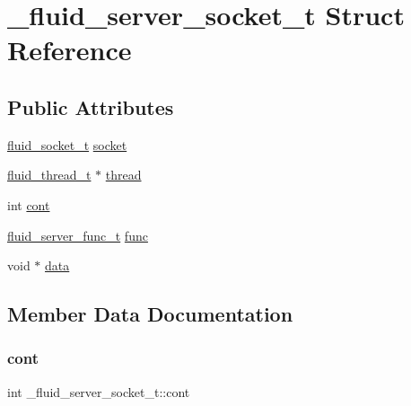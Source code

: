 \hypertarget{struct__fluid__server__socket__t}{}\section{\+\_\+fluid\+\_\+server\+\_\+socket\+\_\+t Struct Reference}
\label{struct__fluid__server__socket__t}
\subsection*{Public Attributes}
\begin{DoxyCompactItemize}
\item 
\hyperlink{fluidsynth__priv_8h_ad024f40f94120b0766cda0ad9f47be82}{fluid\+\_\+socket\+\_\+t} \hyperlink{struct__fluid__server__socket__t_aefe5bdf3ae401d0ad7e2a2bb50abce82}{socket}
\item 
\hyperlink{fluid__sys_8h_a60a6466e68a45b0f0709f1ebaa7e6f85}{fluid\+\_\+thread\+\_\+t} $\ast$ \hyperlink{struct__fluid__server__socket__t_a415965f938322f4aef48228b3411afaf}{thread}
\item 
int \hyperlink{struct__fluid__server__socket__t_a1c60fad728d81c7e28d7f311e1298542}{cont}
\item 
\hyperlink{fluid__sys_8h_abca7c6851ff769a16e0e7645cb441cd0}{fluid\+\_\+server\+\_\+func\+\_\+t} \hyperlink{struct__fluid__server__socket__t_acfeb0d4f1ce8e0f6ae80d26ff1e2d21d}{func}
\item 
void $\ast$ \hyperlink{struct__fluid__server__socket__t_ac0fcd76ae584403ea45c04b974e421da}{data}
\end{DoxyCompactItemize}


\subsection{Member Data Documentation}
\mbox{\label{struct__fluid__server__socket__t_a1c60fad728d81c7e28d7f311e1298542}} 
\subsubsection{\texorpdfstring{cont}{cont}}
{\footnotesize\ttfamily int \+\_\+fluid\+\_\+server\+\_\+socket\+\_\+t\+::cont}

